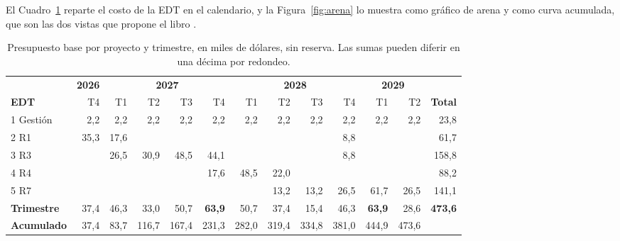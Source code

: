 \documentclass[11pt,letterpaper]{article}
\begin{document}
El Cuadro~\ref{tab:presupuesto} reparte el costo de la EDT en el calendario, y
la Figura~\ref{fig:arena} lo muestra como gráfico de arena y como curva
acumulada, que son las dos vistas que propone el libro
\autocite[sec.~16.2.3]{deweck2022}.

\begin{table}[H]
\centering
\footnotesize
\setlength{\tabcolsep}{2.8pt}
\caption{Presupuesto base por proyecto y trimestre, en miles de dólares, sin
reserva. Las sumas pueden diferir en una décima por redondeo.}
\label{tab:presupuesto}
\begin{tabular}{@{}l*{11}{r}r@{}}
\toprule
 & \multicolumn{1}{c}{\textbf{2026}} & \multicolumn{4}{c}{\textbf{2027}} &
   \multicolumn{4}{c}{\textbf{2028}} & \multicolumn{2}{c}{\textbf{2029}} & \\
\cmidrule(lr){2-2}\cmidrule(lr){3-6}\cmidrule(lr){7-10}\cmidrule(lr){11-12}
\textbf{EDT} & T4 & T1 & T2 & T3 & T4 & T1 & T2 & T3 & T4 & T1 & T2 &
  \textbf{Total} \\
\midrule
1 Gestión & 2,2 & 2,2 & 2,2 & 2,2 & 2,2 & 2,2 & 2,2 & 2,2 & 2,2 & 2,2 & 2,2 & 23,8 \\
2 R1      & 35,3 & 17,6 & & & & & & & 8,8 & & & 61,7 \\
3 R3      & & 26,5 & 30,9 & 48,5 & 44,1 & & & & 8,8 & & & 158,8 \\
4 R4      & & & & & 17,6 & 48,5 & 22,0 & & & & & 88,2 \\
5 R7      & & & & & & & 13,2 & 13,2 & 26,5 & 61,7 & 26,5 & 141,1 \\
\midrule
\textbf{Trimestre} & 37,4 & 46,3 & 33,0 & 50,7 & \textbf{63,9} & 50,7 & 37,4 &
  15,4 & 46,3 & \textbf{63,9} & 28,6 & \textbf{473,6} \\
\textbf{Acumulado} & 37,4 & 83,7 & 116,7 & 167,4 & 231,3 & 282,0 & 319,4 &
  334,8 & 381,0 & 444,9 & 473,6 & \\
\bottomrule
\end{tabular}
\end{table}
\end{document}
